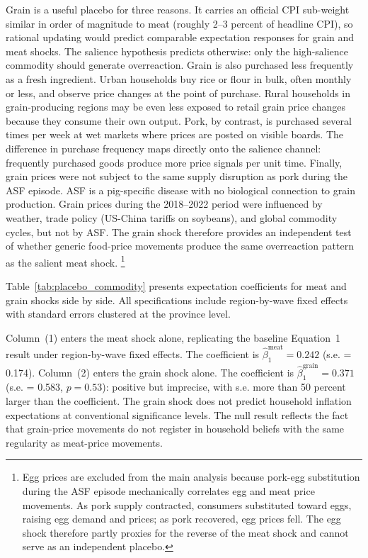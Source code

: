 Grain is a useful placebo for three reasons.
It carries an official CPI sub-weight similar in order of
magnitude to meat (roughly 2--3 percent of headline CPI),
so rational updating would predict comparable expectation
responses for grain and meat shocks.
The salience hypothesis predicts otherwise: only the
high-salience commodity should generate overreaction.
Grain is also purchased less frequently as a fresh ingredient.
Urban households buy rice or flour in bulk, often monthly or
less, and observe price changes at the point of purchase.
Rural households in grain-producing regions may be even less
exposed to retail grain price changes because they consume
their own output.
Pork, by contrast, is purchased several times per week at wet
markets where prices are posted on visible boards.
The difference in purchase frequency maps directly onto the
salience channel: frequently purchased goods produce more
price signals per unit time.
Finally, grain prices were not subject to the same supply
disruption as pork during the ASF episode.
ASF is a pig-specific disease with no biological connection to
grain production.
Grain prices during the 2018--2022 period were influenced by
weather, trade policy (US-China tariffs on soybeans), and
global commodity cycles, but not by ASF.
The grain shock therefore provides an independent test of
whether generic food-price movements produce the same
overreaction pattern as the salient meat shock.%
\footnote{Egg prices are excluded from the main analysis because
pork-egg substitution during the ASF episode mechanically
correlates egg and meat price movements. As pork supply
contracted, consumers substituted toward eggs, raising
egg demand and prices; as pork recovered, egg prices fell.
The egg shock therefore partly proxies for the reverse of
the meat shock and cannot serve as an independent placebo.}

Table~\ref{tab:placebo_commodity} presents expectation
coefficients for meat and grain shocks side by side.
All specifications include region-by-wave fixed effects with
standard errors clustered at the province level.

Column~(1) enters the meat shock alone, replicating the
baseline Equation~1 result under region-by-wave fixed effects.
The coefficient is $\hat{\beta}_1^{\text{meat}} = 0.242$
(s.e. = 0.174).
Column~(2) enters the grain shock alone.
The coefficient is $\hat{\beta}_1^{\text{grain}} = 0.371$
(s.e. = 0.583, $p = 0.53$): positive but imprecise, with
s.e. more than 50 percent larger than the
coefficient.
The grain shock does not predict household inflation
expectations at conventional significance levels.
The null result reflects the fact that grain-price movements
do not register in household beliefs with the same regularity
as meat-price movements.

